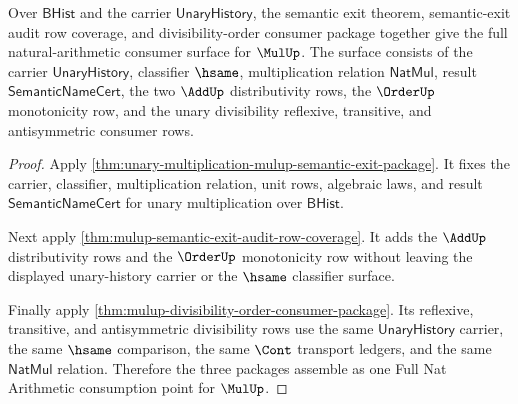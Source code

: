 \begin{theorem}
\label{thm:mulup-semantic-exit-and-divisibility-order-phase-package}
Over $\mathsf{BHist}$ and the carrier $\mathsf{UnaryHistory}$, the semantic
exit theorem, semantic-exit audit row coverage, and divisibility-order consumer
package together give the full natural-arithmetic consumer surface for
$\MulUp$. The surface consists of the carrier $\mathsf{UnaryHistory}$,
classifier $\hsame$, multiplication relation $\mathsf{NatMul}$, result
$\mathsf{SemanticNameCert}$, the two $\AddUp$ distributivity rows, the
$\OrderUp$ monotonicity row, and the unary divisibility reflexive, transitive,
and antisymmetric consumer rows.
\end{theorem}
\begin{proof}
Apply \autoref{thm:unary-multiplication-mulup-semantic-exit-package}. It fixes
the carrier, classifier, multiplication relation, unit rows, algebraic laws, and
result $\mathsf{SemanticNameCert}$ for unary multiplication over
$\mathsf{BHist}$.

Next apply \autoref{thm:mulup-semantic-exit-audit-row-coverage}. It adds the
$\AddUp$ distributivity rows and the $\OrderUp$ monotonicity row without leaving
the displayed unary-history carrier or the $\hsame$ classifier surface.

Finally apply \autoref{thm:mulup-divisibility-order-consumer-package}. Its
reflexive, transitive, and antisymmetric divisibility rows use the same
$\mathsf{UnaryHistory}$ carrier, the same $\hsame$ comparison, the same $\Cont$
transport ledgers, and the same $\mathsf{NatMul}$ relation. Therefore the three
packages assemble as one Full Nat Arithmetic consumption point for $\MulUp$.
\end{proof}

